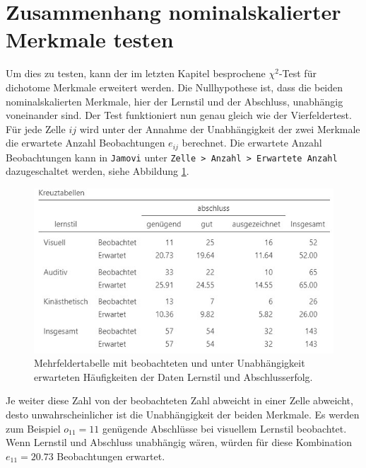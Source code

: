 \documentclass[
]{book}
\theoremstyle{definition}
\theoremstyle{definition}
\theoremstyle{definition}
\theoremstyle{definition}
\theoremstyle{remark}
\begin{document}
\section{Zusammenhang nominalskalierter Merkmale testen}\label{zusammenhang-nominalskalierter-merkmale-testen}

Um dies zu testen, kann der im letzten Kapitel besprochene \(\chi^2\)-Test für dichotome Merkmale erweitert werden. Die Nullhypothese ist, dass die beiden nominalskalierten Merkmale, hier der Lernstil und der Abschluss, unabhängig voneinander sind. Der Test funktioniert nun genau gleich wie der Vierfeldertest. Für jede Zelle \(ij\) wird unter der Annahme der Unabhängigkeit der zwei Merkmale die erwartete Anzahl Beobachtungen \(e_{ij}\) berechnet. Die erwartete Anzahl Beobachtungen kann in \texttt{Jamovi} unter \texttt{Zelle\ \textgreater{}\ Anzahl\ \textgreater{}\ Erwartete\ Anzahl} dazugeschaltet werden, siehe Abbildung \ref{fig:exm-learning-style-data-view-expected}.

\begin{figure}

{\centering \includegraphics{figures/10-exm-learning-style-data-view-expected} 

}

\caption{Mehrfeldertabelle mit beobachteten und unter Unabhängigkeit erwarteten Häufigkeiten der Daten Lernstil und Abschlusserfolg.}\label{fig:exm-learning-style-data-view-expected}
\end{figure}

Je weiter diese Zahl von der beobachteten Zahl abweicht in einer Zelle abweicht, desto unwahrscheinlicher ist die Unabhängigkeit der beiden Merkmale. Es werden zum Beispiel \(o_{11}=11\) genügende Abschlüsse bei visuellem Lernstil beobachtet. Wenn Lernstil und Abschluss unabhängig wären, würden für diese Kombination \(e_{11} =20.73\) Beobachtungen erwartet.
\end{document}
